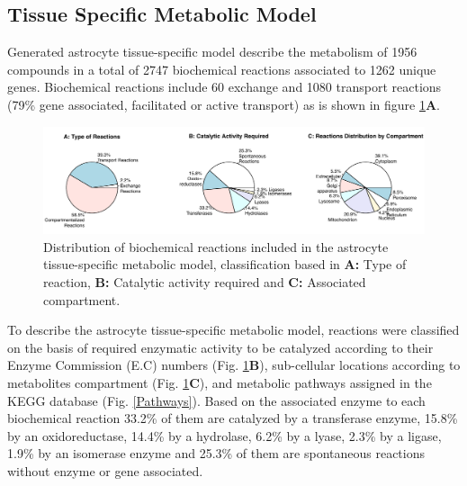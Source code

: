 \subsection*{Tissue Specific Metabolic Model}
Generated astrocyte tissue-specific model describe the metabolism of 1956 compounds in a total of 2747 biochemical reactions associated to 1262 unique genes. Biochemical reactions include 60 exchange and 1080 transport reactions (79\% gene associated, facilitated or active transport) as is shown in figure \ref{Reactions}\textbf{A}.  
\begin{figure}[h]
\begin{center}
\includegraphics[width=\textwidth]{neuroprotective/RXN}
\end{center}
\caption{Distribution of biochemical reactions included in the astrocyte tissue-specific metabolic model, classification based in \textbf{A:} Type of reaction, \textbf{B:} Catalytic activity required and \textbf{C:} Associated compartment.}
\label{Reactions}
\end{figure}
To describe the astrocyte tissue-specific metabolic model, reactions were classified on the basis of required enzymatic activity to be catalyzed according to their Enzyme Commission (E.C) numbers (Fig. \ref{Reactions}\textbf{B}), sub-cellular locations according to metabolites compartment (Fig. \ref{Reactions}\textbf{C}), and metabolic pathways assigned in the KEGG database (Fig. \ref{Pathways}).  Based on the associated enzyme to each biochemical reaction 33.2\% of them are catalyzed by a transferase enzyme, 15.8\% by an oxidoreductase, 14.4\% by a hydrolase, 6.2\% by a lyase, 2.3\% by a ligase, 1.9\% by an isomerase enzyme and 25.3\% of them are spontaneous reactions without enzyme or gene associated. 
